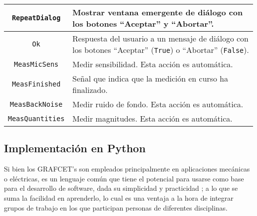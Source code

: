 \begin{table}[!h]
\begin{tabularx}{\textwidth}{c|X}
        {\tiny\texttt{RepeatDialog}}           & Mostrar ventana emergente de diálogo con los botones ``Aceptar'' y ``Abortar''. \\ \hline
        {\tiny\texttt{Ok}} & Respuesta del usuario a un mensaje de diálogo con los botones ``Aceptar'' ({\tiny\texttt{True}})
        o ``Abortar'' ({\tiny\texttt{False}}). \\ \hline
        {\tiny\texttt{MeasMicSens}}            & Medir sensibilidad.
        Esta acción es automática.                                  \\ \hline
        {\tiny\texttt{MeasFinished}}           & Señal que indica que la medición en curso ha finalizado.                        \\ \hline
        {\tiny\texttt{MeasBackNoise}}          & Medir ruido de fondo.
        Esta acción es automática.                                \\ \hline
        {\tiny\texttt{MeasQuantities}}         & Medir magnitudes.
        Esta acción es automática.
    \end{tabularx}
\end{table}

\vfill
\clearpage

\subsection{Implementación en Python}
Si bien los GRAFCET's son empleados principalmente en aplicaciones mecánicas o eléctricas, es un lenguaje común que tiene el potencial para usarse como base para el desarrollo de software, dada su simplicidad y practicidad ; a lo que se suma la facilidad en aprenderlo, lo cual es una ventaja a la hora de integrar grupos de trabajo en los que participan personas de diferentes disciplinas.

